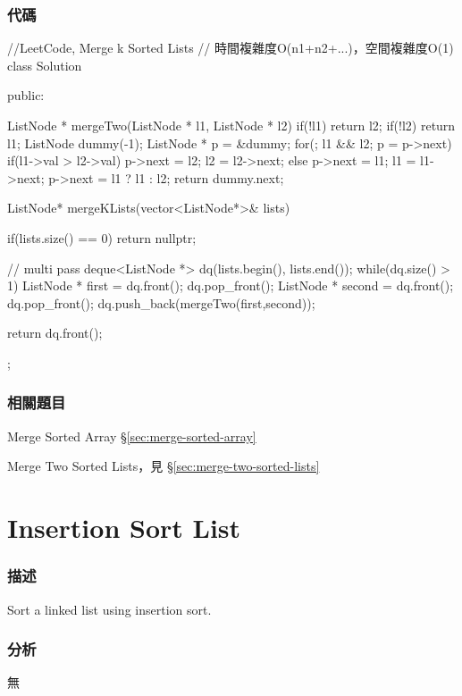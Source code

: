 \subsubsection{代碼}
\begin{Code}
//LeetCode, Merge k Sorted Lists
// 時間複雜度O(n1+n2+...)，空間複雜度O(1)
class Solution {
public:

    ListNode * mergeTwo(ListNode * l1, ListNode * l2){
        if(!l1) return l2;
        if(!l2) return l1;
        ListNode dummy(-1);
        ListNode * p = &dummy;
        for(; l1 && l2; p = p->next){
            if(l1->val > l2->val){
                p->next = l2; l2 = l2->next;
            }
            else{
                p->next = l1; l1 = l1->next;
            }
        }
        p->next = l1 ? l1 : l2;
        return dummy.next;
    }

    ListNode* mergeKLists(vector<ListNode*>& lists) {
        if(lists.size() == 0) return nullptr;

        // multi pass
        deque<ListNode *> dq(lists.begin(), lists.end());
        while(dq.size() > 1){
            ListNode * first = dq.front(); dq.pop_front();
            ListNode * second = dq.front(); dq.pop_front();
            dq.push_back(mergeTwo(first,second));
        }

        return dq.front();
    }
};
\end{Code}


\subsubsection{相關題目}
\begindot
\item Merge Sorted Array \S \ref{sec:merge-sorted-array}
\item Merge Two Sorted Lists，見 \S \ref{sec:merge-two-sorted-lists}
\myenddot


\section{Insertion Sort List} %
\label{sec:insertion-sort-list}


\subsubsection{描述}
Sort a linked list using insertion sort.


\subsubsection{分析}
無


